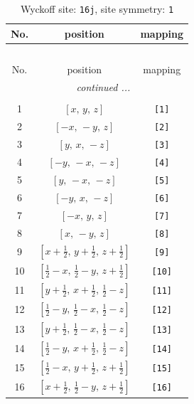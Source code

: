 \documentclass[fleqn,8pt]{jsarticle}
\begin{document}
\begin{longtable}{ccc}
\caption{Wyckoff site: {\tt 16j}, site symmetry: {\tt 1}}
 \\
 \hline \hline
No. & position & mapping \\ \hline \endfirsthead

\multicolumn{2}{l}{\tablename\ \thetable{}} \\
 \hline \hline
No. & position & mapping \\ \hline \endhead

 \hline \hline
\multicolumn{2}{r}{\footnotesize\it continued ...} \\ \endfoot

 \hline \hline
\multicolumn{2}{r}{} \\ \endlastfoot

1 & $\left[ x,\, y,\, z \right]$ & {\tt [1]} \\ \hline
2 & $\left[ - x,\, - y,\, z \right]$ & {\tt [2]} \\ \hline
3 & $\left[ y,\, x,\, - z \right]$ & {\tt [3]} \\ \hline
4 & $\left[ - y,\, - x,\, - z \right]$ & {\tt [4]} \\ \hline
5 & $\left[ y,\, - x,\, - z \right]$ & {\tt [5]} \\ \hline
6 & $\left[ - y,\, x,\, - z \right]$ & {\tt [6]} \\ \hline
7 & $\left[ - x,\, y,\, z \right]$ & {\tt [7]} \\ \hline
8 & $\left[ x,\, - y,\, z \right]$ & {\tt [8]} \\ \hline
9 & $\left[ x + \frac{1}{2},\, y + \frac{1}{2},\, z + \frac{1}{2} \right]$ & {\tt [9]} \\ \hline
10 & $\left[ \frac{1}{2} - x,\, \frac{1}{2} - y,\, z + \frac{1}{2} \right]$ & {\tt [10]} \\ \hline
11 & $\left[ y + \frac{1}{2},\, x + \frac{1}{2},\, \frac{1}{2} - z \right]$ & {\tt [11]} \\ \hline
12 & $\left[ \frac{1}{2} - y,\, \frac{1}{2} - x,\, \frac{1}{2} - z \right]$ & {\tt [12]} \\ \hline
13 & $\left[ y + \frac{1}{2},\, \frac{1}{2} - x,\, \frac{1}{2} - z \right]$ & {\tt [13]} \\ \hline
14 & $\left[ \frac{1}{2} - y,\, x + \frac{1}{2},\, \frac{1}{2} - z \right]$ & {\tt [14]} \\ \hline
15 & $\left[ \frac{1}{2} - x,\, y + \frac{1}{2},\, z + \frac{1}{2} \right]$ & {\tt [15]} \\ \hline
16 & $\left[ x + \frac{1}{2},\, \frac{1}{2} - y,\, z + \frac{1}{2} \right]$ & {\tt [16]} \\
\end{longtable}
\end{document}
